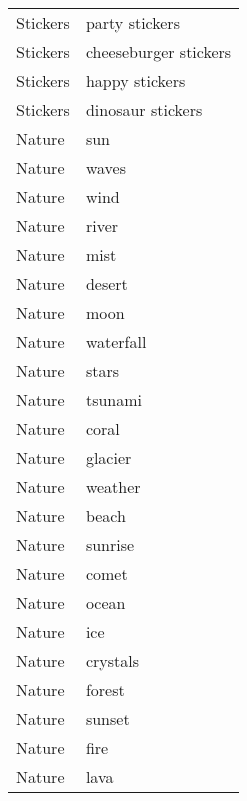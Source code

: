 \begin{supertabular}{l p{0.25\textwidth}}
         Stickers &                     party stickers \\
         Stickers &              cheeseburger stickers \\
         Stickers &                     happy stickers \\
         Stickers &                  dinosaur stickers \\
           Nature &                                sun \\
           Nature &                              waves \\
           Nature &                               wind \\
           Nature &                              river \\
           Nature &                               mist \\
           Nature &                             desert \\
           Nature &                               moon \\
           Nature &                          waterfall \\
           Nature &                              stars \\
           Nature &                            tsunami \\
           Nature &                              coral \\
           Nature &                            glacier \\
           Nature &                            weather \\
           Nature &                              beach \\
           Nature &                            sunrise \\
           Nature &                              comet \\
           Nature &                              ocean \\
           Nature &                                ice \\
           Nature &                           crystals \\
           Nature &                             forest \\
           Nature &                             sunset \\
           Nature &                               fire \\
           Nature &                               lava \\

\end{supertabular}
